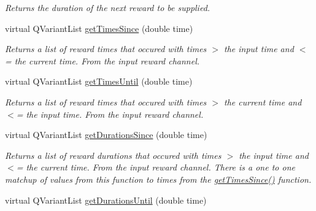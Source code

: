 \begin{DoxyCompactItemize}
\begin{DoxyCompactList}\small\item\em Returns the duration of the next reward to be supplied. \end{DoxyCompactList}\item 
\hypertarget{class_picto_1_1_reward_state_ab5fdd7ffc306e9ffbc4d9e2ab6c19fcd}{virtual Q\-Variant\-List \hyperlink{class_picto_1_1_reward_state_ab5fdd7ffc306e9ffbc4d9e2ab6c19fcd}{get\-Times\-Since} (double time)}\label{class_picto_1_1_reward_state_ab5fdd7ffc306e9ffbc4d9e2ab6c19fcd}

\begin{DoxyCompactList}\small\item\em Returns a list of reward times that occured with times $>$ the input time and $<$= the current time. From the input reward channel. \end{DoxyCompactList}\item 
\hypertarget{class_picto_1_1_reward_state_a32737cd71bb1dacc99211ef78fc943d2}{virtual Q\-Variant\-List \hyperlink{class_picto_1_1_reward_state_a32737cd71bb1dacc99211ef78fc943d2}{get\-Times\-Until} (double time)}\label{class_picto_1_1_reward_state_a32737cd71bb1dacc99211ef78fc943d2}

\begin{DoxyCompactList}\small\item\em Returns a list of reward times that occured with times $>$ the current time and $<$= the input time. From the input reward channel. \end{DoxyCompactList}\item 
\hypertarget{class_picto_1_1_reward_state_a02a27b7a101d07f542bee34bdb3a504a}{virtual Q\-Variant\-List \hyperlink{class_picto_1_1_reward_state_a02a27b7a101d07f542bee34bdb3a504a}{get\-Durations\-Since} (double time)}\label{class_picto_1_1_reward_state_a02a27b7a101d07f542bee34bdb3a504a}

\begin{DoxyCompactList}\small\item\em Returns a list of reward durations that occured with times $>$ the input time and $<$= the current time. From the input reward channel. There is a one to one matchup of values from this function to times from the \hyperlink{class_picto_1_1_reward_state_ab5fdd7ffc306e9ffbc4d9e2ab6c19fcd}{get\-Times\-Since()} function. \end{DoxyCompactList}\item 
\hypertarget{class_picto_1_1_reward_state_a9087bab96fa6cef3a311949b91dd48c9}{virtual Q\-Variant\-List \hyperlink{class_picto_1_1_reward_state_a9087bab96fa6cef3a311949b91dd48c9}{get\-Durations\-Until} (double time)}\label{class_picto_1_1_reward_state_a9087bab96fa6cef3a311949b91dd48c9}


\end{DoxyCompactItemize}
